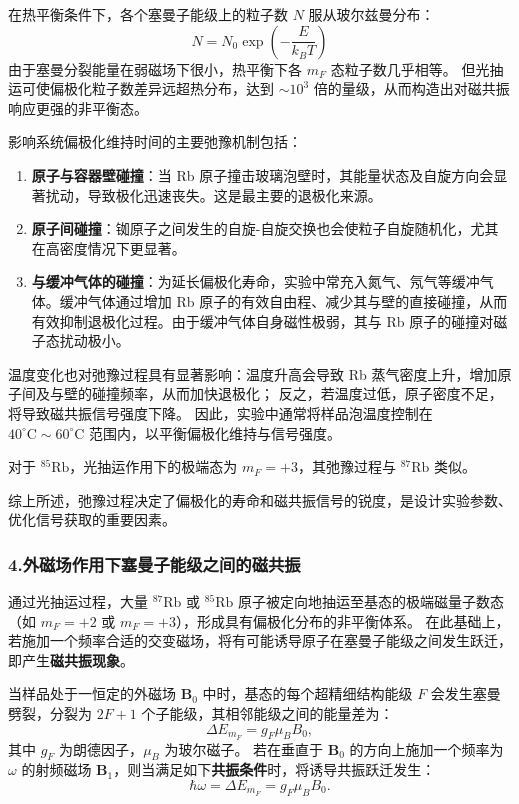 \documentclass[12pt,a4paper,UTF8]{ctexart}
\begin{document}
在热平衡条件下，各个塞曼子能级上的粒子数 $N$ 服从玻尔兹曼分布：
\[
N = N_0 \exp\left(-\frac{E}{k_B T}\right)
\]
由于塞曼分裂能量在弱磁场下很小，热平衡下各 $m_F$ 态粒子数几乎相等。
但光抽运可使偏极化粒子数差异远超热分布，达到 $\sim 10^3$ 倍的量级，从而构造出对磁共振响应更强的非平衡态。

影响系统偏极化维持时间的主要弛豫机制包括：

\begin{enumerate}
  \item \textbf{原子与容器壁碰撞}：当 Rb 原子撞击玻璃泡壁时，其能量状态及自旋方向会显著扰动，导致极化迅速丧失。这是最主要的退极化来源。
  
  \item \textbf{原子间碰撞}：铷原子之间发生的自旋-自旋交换也会使粒子自旋随机化，尤其在高密度情况下更显著。
  
  \item \textbf{与缓冲气体的碰撞}：为延长偏极化寿命，实验中常充入氮气、氖气等缓冲气体。缓冲气体通过增加 Rb 原子的有效自由程、减少其与壁的直接碰撞，从而有效抑制退极化过程。由于缓冲气体自身磁性极弱，其与 Rb 原子的碰撞对磁子态扰动极小。
\end{enumerate}

温度变化也对弛豫过程具有显著影响：温度升高会导致 Rb 蒸气密度上升，增加原子间及与壁的碰撞频率，从而加快退极化；
反之，若温度过低，原子密度不足，将导致磁共振信号强度下降。
因此，实验中通常将样品泡温度控制在 $40^\circ\mathrm{C} \sim 60^\circ\mathrm{C}$ 范围内，以平衡偏极化维持与信号强度。

对于 $^{85}\mathrm{Rb}$，光抽运作用下的极端态为 $m_F = +3$，其弛豫过程与 $^{87}\mathrm{Rb}$ 类似。

综上所述，弛豫过程决定了偏极化的寿命和磁共振信号的锐度，是设计实验参数、优化信号获取的重要因素。

\subsubsection*{4.外磁场作用下塞曼子能级之间的磁共振}
通过光抽运过程，大量 $^{87}\mathrm{Rb}$ 或 $^{85}\mathrm{Rb}$ 原子被定向地抽运至基态的极端磁量子数态（如 $m_F = +2$ 或 $m_F = +3$），形成具有偏极化分布的非平衡体系。
在此基础上，若施加一个频率合适的交变磁场，将有可能诱导原子在塞曼子能级之间发生跃迁，即产生\textbf{磁共振现象}。

当样品处于一恒定的外磁场 $\mathbf{B}_0$ 中时，基态的每个超精细结构能级 $F$ 会发生塞曼劈裂，分裂为 $2F + 1$ 个子能级，其相邻能级之间的能量差为：
\[
\Delta E_{m_F} = g_F \mu_B B_0,
\]
其中 $g_F$ 为朗德因子，$\mu_B$ 为玻尔磁子。
若在垂直于 $\mathbf{B}_0$ 的方向上施加一个频率为 $\omega$ 的射频磁场 $\mathbf{B}_1$，则当满足如下\textbf{共振条件}时，将诱导共振跃迁发生：
\[
\hbar \omega = \Delta E_{m_F} = g_F \mu_B B_0.
\]
\end{document}
